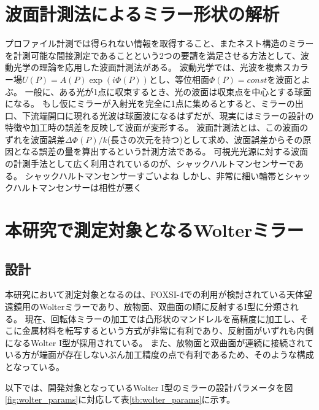 \clearpage
\newpage
\section{波面計測法によるミラー形状の解析}
\label{chap1_wave_metrics}

プロファイル計測では得られない情報を取得すること、またネスト構造のミラーを計測可能な間接測定であることという2つの要請を満足させる方法として、波動光学の理論を応用した波面計測法がある。
波動光学では、光波を複素スカラー場$U(P)=A(P)\exp(i\Phi(P))$とし、等位相面$\Phi(P)=const$を波面とよぶ。
一般に、ある光が1点に収束するとき、光の波面は収束点を中心とする球面になる。
もし仮にミラーが入射光を完全に1点に集めるとすると、ミラーの出口、下流端開口に現れる光波は球面波になるはずだが、現実にはミラーの設計の特徴や加工時の誤差を反映して波面が変形する。
波面計測法とは、この波面のずれを波面誤差$\Delta\Phi(P)/k$(長さの次元を持つ)として求め、波面誤差からその原因となる誤差の量を算出するという計測方法である。
可視光光源に対する波面の計測手法として広く利用されているのが、シャックハルトマンセンサーである。
シャックハルトマンセンサーすごいよね
しかし、非常に細い輪帯とシャックハルトマンセンサーは相性が悪く


\clearpage
\newpage

\section{本研究で測定対象となるWolterミラー}
\label{chap1_target_wolter}

\subsection{設計}
\label{chap1_wolter_arrangement}
本研究において測定対象となるのは、FOXSI-4での利用が検討されている天体望遠鏡用のWolterミラーであり、放物面、双曲面の順に反射するI型に分類される。
現在、回転体ミラーの加工では凸形状のマンドレルを高精度に加工し、そこに金属材料を転写するという方式が非常に有利であり、反射面がいずれも内側になるWolter I型が採用されている。
また、放物面と双曲面が連続に接続されている方が端面が存在しないぶん加工精度の点で有利であるため、そのような構成となっている。

以下では、開発対象となっているWolter I型のミラーの設計パラメータを図\ref{fig:wolter_params}に対応して表\ref{tb:wolter_params}に示す。

